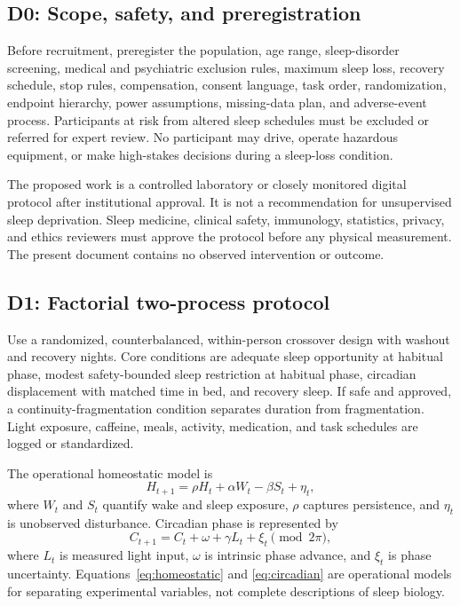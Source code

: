 \documentclass[conference]{IEEEtran}
\begin{document}
\subsection{D0: Scope, safety, and preregistration}
Before recruitment, preregister the population, age range, sleep-disorder screening, medical and psychiatric exclusion rules, maximum sleep loss, recovery schedule, stop rules, compensation, consent language, task order, randomization, endpoint hierarchy, power assumptions, missing-data plan, and adverse-event process. Participants at risk from altered sleep schedules must be excluded or referred for expert review. No participant may drive, operate hazardous equipment, or make high-stakes decisions during a sleep-loss condition.

The proposed work is a controlled laboratory or closely monitored digital protocol after institutional approval. It is not a recommendation for unsupervised sleep deprivation. Sleep medicine, clinical safety, immunology, statistics, privacy, and ethics reviewers must approve the protocol before any physical measurement. The present document contains no observed intervention or outcome.

\subsection{D1: Factorial two-process protocol}
Use a randomized, counterbalanced, within-person crossover design with washout and recovery nights. Core conditions are adequate sleep opportunity at habitual phase, modest safety-bounded sleep restriction at habitual phase, circadian displacement with matched time in bed, and recovery sleep. If safe and approved, a continuity-fragmentation condition separates duration from fragmentation. Light exposure, caffeine, meals, activity, medication, and task schedules are logged or standardized.

The operational homeostatic model is
\begin{equation}
H_{t+1}=\rho H_t+\alpha W_t-\beta S_t+\eta_t,
\label{eq:homeostatic}
\end{equation}
where $W_t$ and $S_t$ quantify wake and sleep exposure, $\rho$ captures persistence, and $\eta_t$ is unobserved disturbance. Circadian phase is represented by
\begin{equation}
C_{t+1}=C_t+\omega+\gamma L_t+\xi_t \pmod {2\pi},
\label{eq:circadian}
\end{equation}
where $L_t$ is measured light input, $\omega$ is intrinsic phase advance, and $\xi_t$ is phase uncertainty. Equations~\eqref{eq:homeostatic} and \eqref{eq:circadian} are operational models for separating experimental variables, not complete descriptions of sleep biology.
\end{document}
